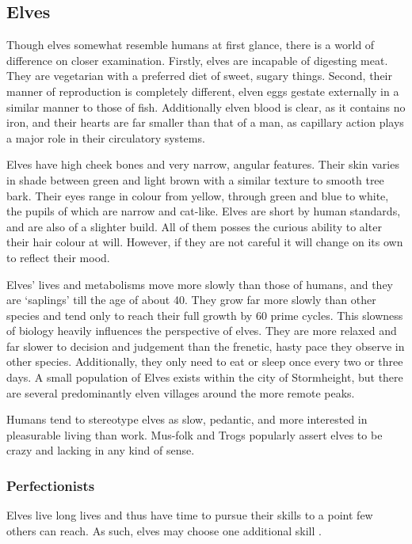 \documentclass[a4paper,11pt,oneside]{book}
\newcommand{\textlf}[1]{\textbf{\titlecap{#1}}}
\begin{document}
\subsection{Elves}
Though elves somewhat resemble humans at first glance, there is a world of difference on closer examination. Firstly, elves are incapable of digesting meat. They are vegetarian with a preferred diet of sweet, sugary things. Second, their manner of reproduction is completely different, elven eggs gestate externally in a similar manner to those of fish. Additionally elven blood is clear, as it contains no iron, and their hearts are far smaller than that of a man, as capillary action plays a major role in their circulatory systems.

Elves have high cheek bones and very narrow, angular features. Their skin varies in shade between green and light brown with a similar texture to smooth tree bark. Their eyes range in colour from yellow, through green and blue to white, the pupils of which are narrow and cat-like. Elves are short by human standards, and are also of a slighter build. All of them posses the curious ability to alter their hair colour at will. However, if they are not careful it will change on its own to reflect their mood. 

Elves' lives and metabolisms move more slowly than those of humans, and they are `saplings' till the age of about 40. They grow far more slowly than other species and tend only to reach their full growth by 60 prime cycles. This slowness of biology heavily influences the perspective of elves. They are more relaxed and far slower to decision and judgement than the frenetic, hasty pace they observe in other species. Additionally, they only need to eat or sleep once every two or three days. A small population of Elves exists within the city of Stormheight, but there are several predominantly elven villages around the more remote peaks. 

Humans tend to stereotype elves as slow, pedantic, and more interested in pleasurable living than work. Mus-folk and Trogs popularly assert elves to be crazy and lacking in any kind of sense. 

\subsubsection*{Perfectionists}
Elves live long lives and thus have time to pursue their skills to a point few others can reach. As such, elves may choose one additional skill \textlf{proficiency}.
\end{document}
